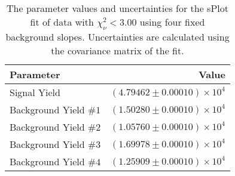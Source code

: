 
\begin{table}[ht]
    \begin{center}
        \begin{tabular}{lr}\toprule
            Parameter & Value \\\midrule
            Signal Yield & $(4.79462 \pm 0.00010) \times 10^{4}$ \\
            Background Yield $\#1$ & $(1.50280 \pm 0.00010) \times 10^{4}$ \\
            Background Yield $\#2$ & $(1.05760 \pm 0.00010) \times 10^{4}$ \\
            Background Yield $\#3$ & $(1.69978 \pm 0.00010) \times 10^{4}$ \\
            Background Yield $\#4$ & $(1.25909 \pm 0.00010) \times 10^{4}$ \\\bottomrule
        \end{tabular}
        \caption{The parameter values and uncertainties for the sPlot fit of data with $\chi^2_\nu < 3.00$ using four fixed background slopes. Uncertainties are calculated using the covariance matrix of the fit.}\label{tab:splot-fit-results-chisqdof-3.00-fixed-4}
    \end{center}
\end{table}
